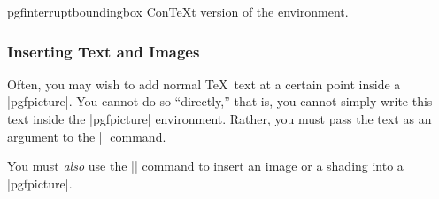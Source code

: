 \begin{contextenvironment}{{pgfinterruptboundingbox}}
  Con\TeX t version of the environment.
\end{contextenvironment}


\subsubsection{Inserting Text and Images}

\label{section-text-command}

Often, you may wish to add normal \TeX\ text at a certain point inside
a |{pgfpicture}|. You cannot do so ``directly,'' that is, you cannot
simply write this text inside the |{pgfpicture}| environment. Rather,
you must pass the text as an argument to the |\pgftext| command.

You must \emph{also} use the |\pgftext| command to insert an image or
a shading into a |{pgfpicture}|.

